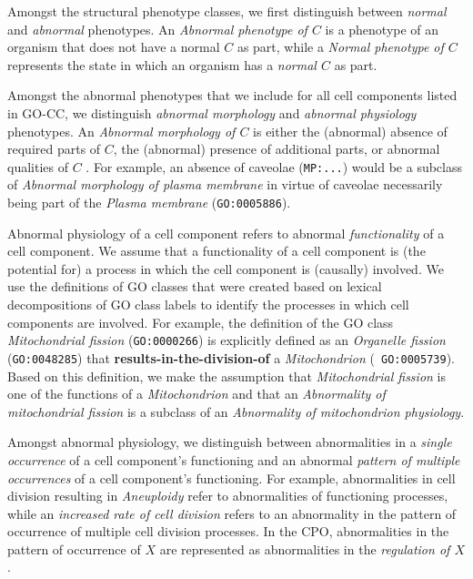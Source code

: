 \documentclass{bioinfo}
\renewcommand{\cite}{\citep}
\begin{document}
Amongst the structural phenotype classes, we first distinguish between
{\em normal} and {\em abnormal} phenotypes. An {\em Abnormal phenotype
  of $C$} is a phenotype of an organism that does not have a normal
$C$ as part, while a {\em Normal phenotype of $C$} represents the
state in which an organism has a {\em normal $C$} as part.

Amongst the abnormal phenotypes that we include for all cell
components listed in GO-CC, we distinguish {\em abnormal morphology}
and {\em abnormal physiology} phenotypes. An {\em Abnormal morphology
  of $C$} is either the (abnormal) absence of required parts of $C$,
the (abnormal) presence of additional parts, or abnormal qualities of
$C$ \cite{Hoehndorf2010phene}. For example, an absence of caveolae
({\tt MP:...}) would be a subclass of {\em Abnormal morphology of
  plasma membrane} in virtue of caveolae necessarily being part of the
{\em Plasma membrane} ({\tt GO:0005886}).

Abnormal physiology of a cell component refers to abnormal {\em
  functionality} of a cell component. We assume that a functionality
of a cell component is (the potential for) a process in which the cell
component is (causally) involved. We use the definitions of GO classes
that were created based on lexical decompositions of GO class labels
\cite{Mungall2010go, Bada2007a, Ogren2004} to identify the processes
in which cell components are involved. For example, the definition of
the GO class {\em Mitochondrial fission} ({\tt GO:0000266}) is
explicitly defined as an {\em Organelle fission} ({\tt GO:0048285})
that {\bf results-in-the-division-of} a {\em Mitochondrion} ({\tt
  GO:0005739}). Based on this definition, we make the assumption that
{\em Mitochondrial fission} is one of the functions of a {\em
  Mitochondrion} and that an {\em Abnormality of mitochondrial
  fission} is a subclass of an {\em Abnormality of mitochondrion
  physiology}.

Amongst abnormal physiology, we distinguish between abnormalities in a
{\em single occurrence} of a cell component's functioning and an
abnormal {\em pattern of multiple occurrences} of a cell component's
functioning. For example, abnormalities in cell division resulting in
{\em Aneuploidy} refer to abnormalities of functioning processes,
while an {\em increased rate of cell division} refers to an
abnormality in the pattern of occurrence of multiple cell division
processes. In the CPO, abnormalities in the pattern of occurrence of
$X$ are represented as abnormalities in the {\em regulation of $X$}.
\end{document}
